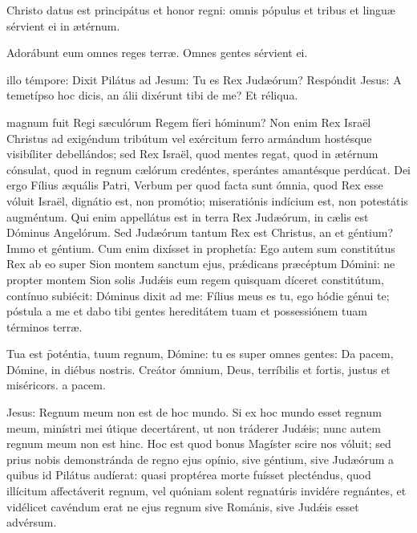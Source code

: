 \documentclass[fontsize=8pt,paper=A6,twoside,BCOR=1mm,DIV=22,headinclude]{scrarticle}
\begin{document}
\begin{multicols}{2}






\A Christo datus est principátus et honor regni: omnis pópulus et tribus et linguæ sérvient ei in ætérnum.

\V Adorábunt eum omnes reges terræ.
\R Omnes gentes sérvient ei.

 illo témpore: Dixit Pilátus ad Jesum: Tu es Rex Judæórum? Respóndit Jesus: A temetípso hoc dicis, an álii dixérunt tibi de me? Et réliqua.

 magnum fuit Regi sæculórum Regem fíeri hóminum? Non enim Rex Israël Christus ad exigéndum tribútum vel exércitum ferro armándum hostésque visibíliter debellándos; sed Rex Israël, quod mentes regat, quod in ætérnum cónsulat, quod in regnum cælórum credéntes, sperántes amantésque perdúcat. Dei ergo Fílius æquális Patri, Verbum per quod facta sunt ómnia, quod Rex esse vóluit Israël, dignátio est, non promótio; miseratiónis indícium est, non potestátis augméntum. Qui enim appellátus est in terra Rex Judæórum, in cælis est Dóminus Angelórum.
Sed Judæórum tantum Rex est Christus, an et géntium? Immo et géntium. Cum enim dixísset in prophetía: Ego autem sum constitútus Rex ab eo super Sion montem sanctum ejus, prǽdicans præcéptum Dómini: ne propter montem Sion solis Judǽis eum regem quisquam díceret constitútum, contínuo subiécit: Dóminus dixit ad me: Fílius meus es tu, ego hódie génui te; póstula a me et dabo tibi gentes hereditátem tuam et possessiónem tuam términos terræ.

\R Tua est \f poténtia, tuum regnum, Dómine: tu es super omnes gentes:
\red{*} Da pacem, Dómine, in diébus nostris.
\V Creátor ómnium, Deus, terríbilis et fortis, justus et miséricors.
a pacem.

{
 Jesus: Regnum meum non est de hoc mundo. Si ex hoc mundo esset regnum meum, minístri mei útique decertárent, ut non tráderer Judǽis; nunc autem regnum meum non est hinc. Hoc est quod bonus Magíster scire nos vóluit; sed prius nobis demonstránda de regno ejus opínio, sive géntium, sive Judæórum a quibus id Pilátus audíerat: quasi proptérea morte fuísset plecténdus, quod illícitum affectáverit regnum, vel quóniam solent regnatúris invidére regnántes, et vidélicet cavéndum erat ne ejus regnum sive Románis, sive Judǽis esset advérsum.

}
\end{multicols}
\end{document}
